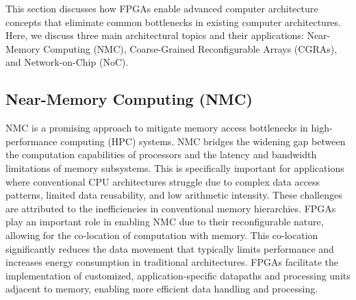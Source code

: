 
This section discusses how FPGAs enable advanced computer architecture concepts that eliminate common bottlenecks in existing computer architectures. Here, we discuss three main architectural topics and their applications: Near-Memory Computing (NMC), Coarse-Grained Reconfigurable Arrays (CGRAs), and Network-on-Chip (NoC). 

\subsection{Near-Memory Computing (NMC)}

NMC is a promising approach to mitigate memory access bottlenecks in high-performance computing (HPC) systems. NMC bridges the widening gap between the computation capabilities of processors and the latency and bandwidth limitations of memory subsystems. This is specifically important for applications where conventional CPU architectures struggle due to complex data access patterns, limited data reusability, and low arithmetic intensity. These challenges are attributed to the inefficiencies in conventional memory hierarchies. FPGAs play an important role in enabling NMC due to their reconfigurable nature, allowing for the co-location of computation with memory. This co-location significantly reduces the data movement that typically limits performance and increases energy consumption in traditional architectures. FPGAs facilitate the implementation of customized, application-specific datapaths and processing units adjacent to memory, enabling more efficient data handling and processing. 

